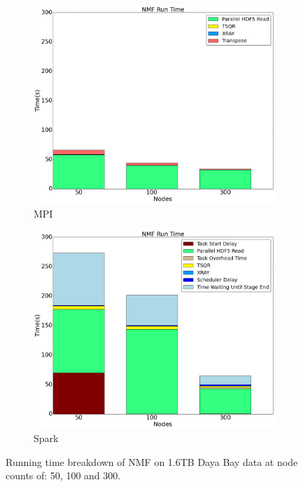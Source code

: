 \begin{figure}[th!]
\begin{subfigure}{.5\textwidth}
\centering
\includegraphics[width=\textwidth]{fig/mpi_nmf_big_scale.png}
\caption{MPI}
\label{fig:mpinmf}
\end{subfigure}
\begin{subfigure}{.5\textwidth}
\centering
\includegraphics[width=\textwidth]{fig/spark_nmf.png}
\caption{Spark}
\label{fig:nmfspark}
\end{subfigure}
\caption{Running time breakdown of NMF on 1.6TB Daya Bay data at 
node counts of: 50, 100 and 300.}
\label{fig:nmfrt}
\end{figure}

